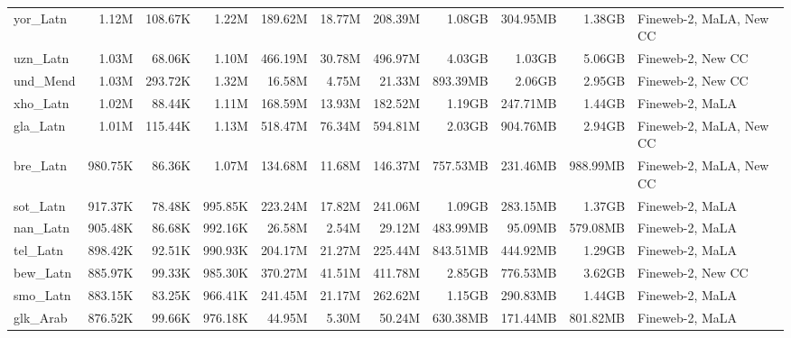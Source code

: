 \begin{table*}[!htp]
{\begin{tabular}{l|rrr|rrr|rrr|l}
yor\_Latn                   & 1.12M      & 108.67K      & 1.22M       & 189.62M      & 18.77M         & 208.39M       & 1.08GB     & 304.95MB     & 1.38GB      & Fineweb-2, MaLA, New CC \\
uzn\_Latn                   & 1.03M      & 68.06K       & 1.10M       & 466.19M      & 30.78M         & 496.97M       & 4.03GB     & 1.03GB       & 5.06GB      & Fineweb-2, New CC       \\
und\_Mend                   & 1.03M      & 293.72K      & 1.32M       & 16.58M       & 4.75M          & 21.33M        & 893.39MB   & 2.06GB       & 2.95GB      & Fineweb-2, New CC       \\
xho\_Latn                   & 1.02M      & 88.44K       & 1.11M       & 168.59M      & 13.93M         & 182.52M       & 1.19GB     & 247.71MB     & 1.44GB      & Fineweb-2, MaLA         \\
gla\_Latn                   & 1.01M      & 115.44K      & 1.13M       & 518.47M      & 76.34M         & 594.81M       & 2.03GB     & 904.76MB     & 2.94GB      & Fineweb-2, MaLA, New CC \\
bre\_Latn                   & 980.75K    & 86.36K       & 1.07M       & 134.68M      & 11.68M         & 146.37M       & 757.53MB   & 231.46MB     & 988.99MB    & Fineweb-2, MaLA, New CC \\
sot\_Latn                   & 917.37K    & 78.48K       & 995.85K     & 223.24M      & 17.82M         & 241.06M       & 1.09GB     & 283.15MB     & 1.37GB      & Fineweb-2, MaLA         \\
nan\_Latn                   & 905.48K    & 86.68K       & 992.16K     & 26.58M       & 2.54M          & 29.12M        & 483.99MB   & 95.09MB      & 579.08MB    & Fineweb-2, MaLA         \\
tel\_Latn                   & 898.42K    & 92.51K       & 990.93K     & 204.17M      & 21.27M         & 225.44M       & 843.51MB   & 444.92MB     & 1.29GB      & Fineweb-2, MaLA         \\
bew\_Latn                   & 885.97K    & 99.33K       & 985.30K     & 370.27M      & 41.51M         & 411.78M       & 2.85GB     & 776.53MB     & 3.62GB      & Fineweb-2, New CC       \\
smo\_Latn                   & 883.15K    & 83.25K       & 966.41K     & 241.45M      & 21.17M         & 262.62M       & 1.15GB     & 290.83MB     & 1.44GB      & Fineweb-2, MaLA         \\
glk\_Arab                   & 876.52K    & 99.66K       & 976.18K     & 44.95M       & 5.30M          & 50.24M        & 630.38MB   & 171.44MB     & 801.82MB    & Fineweb-2, MaLA         \\

\end{tabular}}
\end{table*}
